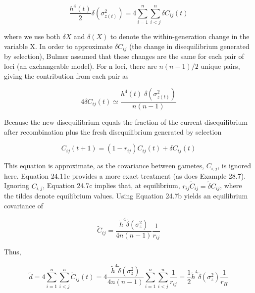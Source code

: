 \documentclass{article}
\begin{document}
\begin{equation}
\frac{h^{4}(t)}{2}\delta(\sigma_{z(t)}^{2})=4\sum_{i=1}^{n}\sum_{i<j}^{n}\delta C_{ij}(t)
\tag{24.7a}
\label{eq:24_7a}
\end{equation}

where we use both  $ \delta X $ and  $ \delta(X) $ to denote the within-generation change in the variable X. In order to approximate  $ \delta C_{ij} $ (the change in disequilibrium generated by selection), Bulmer assumed that these changes are the same for each pair of loci (an exchangeable model). For n loci, there are  $ n(n-1)/2 $ unique pairs, giving the contribution from each pair as

\begin{equation}
4\delta C_{ij}(t)\simeq\frac{h^{4}(t)\;\delta(\sigma_{z(t)}^{2})}{n(n-1)}
\tag{24.7b}
\label{eq:24_7b}
\end{equation}

Because the new disequilibrium equals the fraction of the current disequilibrium after recombination plus the fresh disequilibrium generated by selection

\begin{equation}
C_{ij}(t+1)=\left(1-r_{ij}\right)C_{ij}(t)+\delta C_{ij}(t)
\tag{24.7c}
\label{eq:24_7c}
\end{equation}

This equation is approximate, as the covariance between gametes,  $ C_{i,j} $, is ignored here. Equation 24.11c provides a more exact treatment (as does Example 28.7). Ignoring  $ C_{i,j} $, Equation 24.7c implies that, at equilibrium,  $ r_{ij} \tilde{C}_{ij} = \tilde{\delta} C_{ij} $, where the tildes denote equilibrium values. Using Equation 24.7b yields an equilibrium covariance of

\begin{equation}
\tilde{C}_{ij}=\frac{\tilde{h}^{4}\tilde{\delta}(\sigma_{z}^{2})}{4n\left(n-1\right)}\frac{1}{r_{ij}}
\tag{24.7d}
\label{eq:24_7d}
\end{equation}

Thus,

\begin{equation}
\widetilde{d}=4\sum_{i=1}^{n}\sum_{i<j}^{n}\widetilde{C}_{ij}(t)=4\frac{\widetilde{h}^{4}\widetilde{\delta}(\sigma_{z}^{2})}{4n\left(n-1\right)}\sum_{i=1}^{n}\sum_{i<j}^{n}\frac{1}{r_{ij}}=\frac{1}{2}\widetilde{h}^{4}\widetilde{\delta}(\sigma_{z}^{2})\frac{1}{r_{H}}
\tag{24.8a}
\label{eq:24_8a}
\end{equation}
\end{document}
